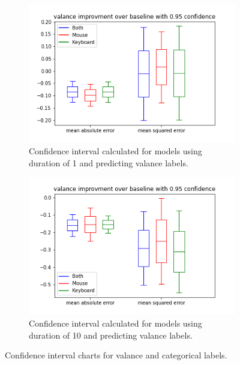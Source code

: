 \begin{figure}
\begin{subfigure}[b]{0.42\textwidth}
        \end{subfigure}
        \begin{subfigure}[b]{0.42\textwidth}
            \centering
            \includegraphics[width=\textwidth]{figures/results/1_valance_0.95.png}
            \captionsetup{justification=centering}
            \caption{Confidence interval calculated for models using duration of 1 and predicting valance labels.}
            \label{fig:val_1}
        \end{subfigure}
        \hfill
        \begin{subfigure}[b]{0.42\textwidth}
            \centering
            \includegraphics[width=\textwidth]{figures/results/10_valance_0.95.png}
            \captionsetup{justification=centering}
            \caption{Confidence interval calculated for models using duration of 10 and predicting valance labels.}
            \label{fig:val_10}
        \end{subfigure}
        \caption{Confidence interval charts for valance and categorical labels.}
        \label{fig:cat_val_5_10}
    \end{figure}

